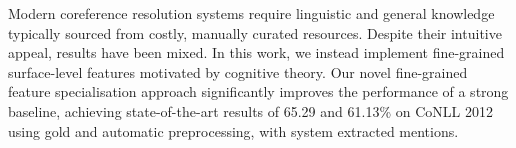 Modern coreference resolution systems require linguistic and general knowledge typically sourced from costly, manually curated resources. Despite their intuitive appeal, results have been mixed. In this work, we instead implement fine-grained surface-level features motivated by cognitive theory. Our novel fine-grained feature specialisation approach significantly improves the performance of a strong baseline, achieving state-of-the-art results of 65.29 and 61.13\% on CoNLL 2012 using gold and automatic preprocessing, with system extracted mentions.
